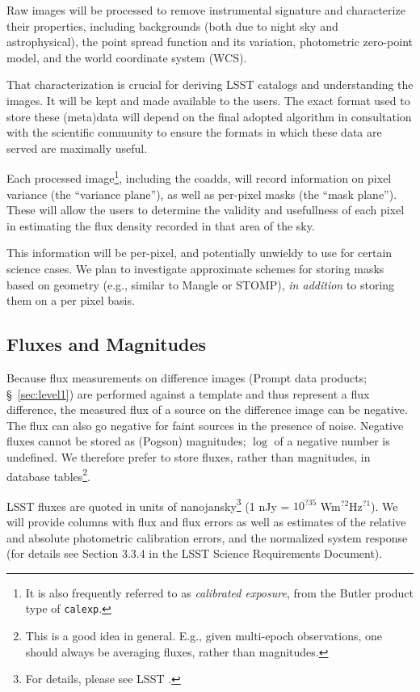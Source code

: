 Raw images will be processed to remove instrumental signature and characterize their properties, including backgrounds (both due to night sky and astrophysical), the point spread function and its variation, photometric zero-point model, and the world coordinate system (WCS).

That characterization is crucial for deriving LSST catalogs and understanding the images. It will be kept and made available to the users. The exact format used to store these (meta)data will depend on the final adopted algorithm in consultation with the scientific community to ensure the formats in which these data are served are maximally useful.

Each processed image\footnote{It is also frequently referred to as \emph{calibrated exposure}, from the Butler product type of \texttt{calexp}.}, including the coadds, will record information on pixel variance (the ``variance plane''), as well as per-pixel masks (the ``mask plane''). These will allow the users to determine the validity and  usefullness  of each pixel in estimating the flux density recorded in that area of the sky.

This information will be per-pixel, and potentially unwieldy to use for certain science cases. We plan to investigate approximate schemes for storing masks based on geometry (e.g., similar to Mangle or STOMP), \emph{in addition} to storing them on a per pixel basis.

\subsection{Fluxes and Magnitudes}
\label{sec:fluxes}
Because flux measurements on difference images (Prompt data products; \S~\ref{sec:level1}) are performed against a template
and thus represent a flux difference, the measured flux of a source on the difference image can be negative. The flux can also go negative for faint sources in the presence of noise. Negative fluxes cannot be stored as (Pogson) magnitudes; $\log$ of a negative number is undefined. We therefore prefer to store fluxes, rather than magnitudes, in database tables\footnote{This is a good idea in general. E.g., given multi-epoch observations, one should always be averaging fluxes, rather than magnitudes.}.

LSST fluxes are quoted in units of nanojansky\footnote{For details, please see LSST .} (1 nJy = $10^{?35}$ Wm$^{?2}$Hz$^{?1}$).
We will provide columns with flux and flux errors as well as estimates of the relative and absolute photometric calibration errors, and the normalized system response (for details see Section 3.3.4 in the LSST Science Requirements Document).

